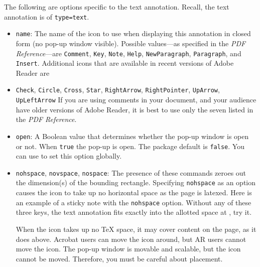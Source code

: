 \documentclass[12pt]{article}
\makeatletter
\renewenvironment{quote}[1][]
   {\def\@rgi{#1}\ifx\@rgi\@empty
    \let\rghtm\@empty\else\def\rghtm{\rightmargin\leftmargin}\fi
    \list{}{\rghtm} %
    \item\relax}
   {\endlist}
\makeatother
\begin{document}
The following are options specific to the text annotation. Recall, the text annotation
is of \texttt{type=text}.
\begin{itemize}
    \item \texttt{name}: The name of the icon to use when displaying this annotation in closed form (no pop-up window visible).
    Possible values---as specified in the \textsl{PDF Reference}---are
    \texttt{Comment}, \texttt{Key}, \texttt{Note}, \texttt{Help},
    \texttt{NewParagraph}, \texttt{Paragraph}, and \texttt{Insert}.
    Additional icons that are available in recent versions of Adobe
    Reader are
\begin{quote}\raggedright
    \texttt{Check}, \texttt{Circle}, \texttt{Cross}, \texttt{Star}, \texttt{RightArrow}, \texttt{RightPointer},
    \texttt{UpArrow}, \texttt{UpLeftArrow}
\end{quote}
        If you are using comments in your document, and your audience have
        older versions of Adobe Reader, it is best to use only the seven
        listed in the \textsl{PDF Reference}.

    \item \texttt{open}: A Boolean value that determines whether the pop-up
        window is open or not. When \texttt{true} the pop-up is open. The
        package default is \texttt{false}. You can use 
        to set this option globally.

    \item \texttt{nohspace}, \texttt{novspace}, \texttt{nospace}: The
        presence of these commands zeroes out the dimension(s) of the
        bounding rectangle. Specifying \texttt{nohspace} as an option
        causes the icon to take up no horizontal space as the page is
        latexed. Here is an example of a sticky note with the
        \texttt{nohspace} option. Without any of these three keys, the text
        annotation  fits
        exactly into the allotted space at
        , try it.

    When the icon takes up no {\TeX} space, it may cover content on
        the page, as it does above. Acrobat users can move the icon
        around, but AR users cannot move the icon. The pop-up window is
        movable and scalable, but the icon cannot be moved. Therefore,
        you must be careful about placement.


\end{itemize}
\end{document}
